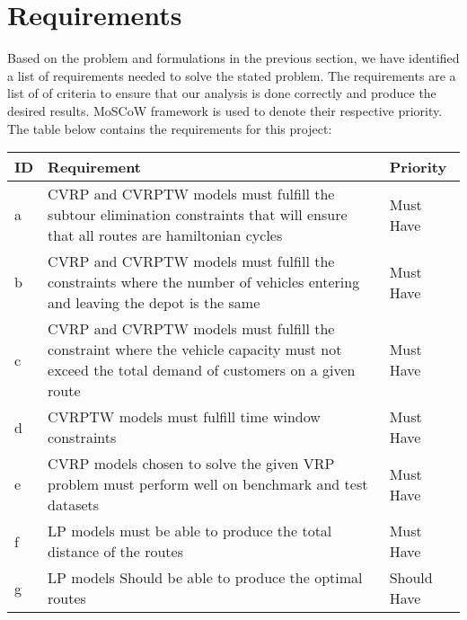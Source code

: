 \section{Requirements}
Based on the problem and formulations in the previous section,
we have identified a list of requirements needed to solve the stated problem.
The requirements are a list of of criteria to ensure that our analysis is done correctly and produce the desired results.
MoSCoW framework is used to denote their respective priority. The table below contains the requirements for this project:
\vspace{0.5cm}
\begin{table}[!ht]
\centering
\begin{tabular}{|l|p{8cm}|l|}
\hline
ID & Requirement                                                                                                                                                     & Priority    \\ \hline
a  & CVRP and CVRPTW models must fulfill the subtour elimination constraints that will ensure that all routes are hamiltonian cycles                                                                                                   & Must Have   \\ \hline
b  & CVRP and CVRPTW models must fulfill the constraints where the number of vehicles entering and leaving the depot is the same                                                                                                       & Must Have   \\ \hline
c  & CVRP and CVRPTW models must fulfill the constraint where the vehicle capacity must not exceed the total demand of customers on a given route                                                                                               & Must Have   \\ \hline
d  & CVRPTW models  must fulfill time window constraints                                                                                               & Must Have   \\ \hline
e  & CVRP models chosen to solve the given VRP problem must perform well on benchmark and test datasets                                                                & Must Have   \\ \hline
f  & LP models must be able to produce the total distance of the routes                                                                                              & Must Have   \\ \hline
g  & LP models Should be able to produce the optimal routes                                                                                                          & Should Have \\ \hline

\end{tabular}
\end{table}

